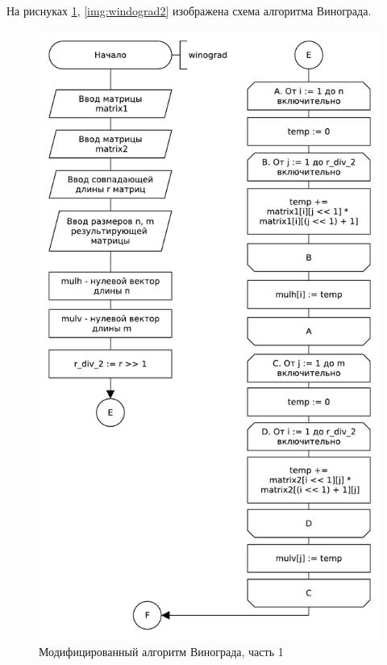 На риснуках \ref{img:windograd1}, \ref{img:windograd2} изображена схема алгоритма Винограда.
\begin{figure}[H]
    \centering
    \includegraphics[scale=0.70]{pdf/owinograd-part1.pdf}
    \caption{Модифицированный алгоритм Винограда, часть 1}
    \label{img:windograd1}
\end{figure}

